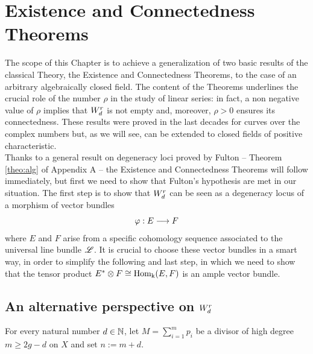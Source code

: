 
\chapter{Existence and Connectedness Theorems} %



\ifpdf
    \graphicspath{{figures/}{figures/}{figures/}}
\else
    \graphicspath{{figures/}{figures/}}
\fi



The scope of this Chapter is to achieve a generalization of two basic results of the classical \BN Theory, the Existence and Connectedness Theorems, to the case of an arbitrary algebraically closed field. The content of the Theorems underlines the crucial role of the \BN number $\rho$ in the study of linear series: in fact, a non negative value of $\rho$ implies that $W_d^r$ is not empty and, moreover, $\rho>0$ ensures its connectedness.
These results were proved in the last decades for curves over the complex numbers but, as we will see, can be extended to closed fields of positive characteristic.\\
Thanks to a general result on degeneracy loci proved by Fulton -- Theorem \ref{theo:alg} of Appendix A -- the Existence and Connectedness Theorems will follow immediately, but first we need to show that Fulton's hypothesis are met in our situation. The first step is to show that $W_d^r$ can be seen as a degeneracy locus of a morphism of vector bundles
$$ \varphi: E\longrightarrow F $$
where $E$ and $F$ arise from a specific cohomology sequence associated to the universal line bundle $\mathscr{L}$. It is crucial to choose these vector bundles in a smart way, in order to simplify the following and last step, in which we need to show that the tensor product $E^*\otimes F \cong \operatorname{Hom_k}(E,F)$ is an ample vector bundle.

\section{An alternative perspective on $W_d^r$}\label{sec:alternative}

	\begin{notation}
		For every natural number $d\in \mathbb{N}$, let $M=\sum_{i=1}^m p_i$ be a divisor of high degree $m\geq2g-d$ on $X$ and set $n:=m+d$.
	\end{notation}	
	

